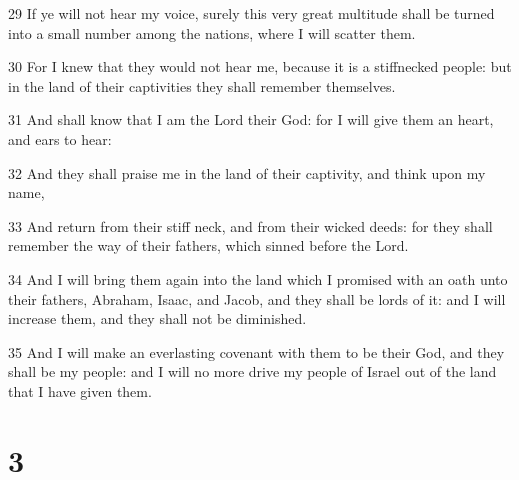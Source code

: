 \par 29 If ye will not hear my voice, surely this very great multitude shall be turned into a small number among the nations, where I will scatter them.
\par 30 For I knew that they would not hear me, because it is a stiffnecked people: but in the land of their captivities they shall remember themselves.
\par 31 And shall know that I am the Lord their God: for I will give them an heart, and ears to hear:
\par 32 And they shall praise me in the land of their captivity, and think upon my name,
\par 33 And return from their stiff neck, and from their wicked deeds: for they shall remember the way of their fathers, which sinned before the Lord.
\par 34 And I will bring them again into the land which I promised with an oath unto their fathers, Abraham, Isaac, and Jacob, and they shall be lords of it: and I will increase them, and they shall not be diminished.
\par 35 And I will make an everlasting covenant with them to be their God, and they shall be my people: and I will no more drive my people of Israel out of the land that I have given them.

\chapter{3}

